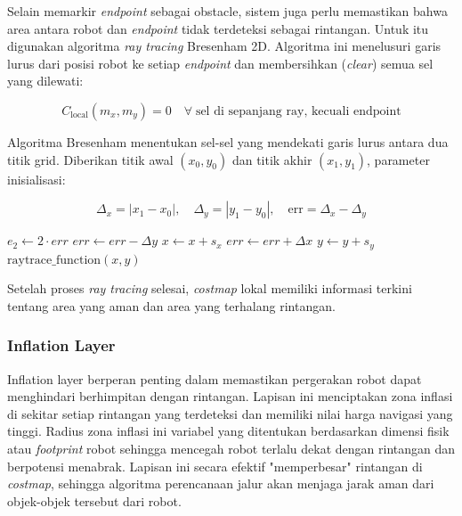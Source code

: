 Selain memarkir \emph{endpoint} sebagai obstacle, sistem juga perlu
memastikan bahwa area antara robot dan \emph{endpoint} tidak terdeteksi
sebagai rintangan. Untuk itu digunakan algoritma \emph{ray tracing}
Bresenham 2D. Algoritma ini menelusuri garis lurus dari posisi robot
ke setiap \emph{endpoint} dan membersihkan (\emph{clear}) semua sel
yang dilewati:

\begin{equation}
C_{\text{local}}(m_x, m_y) = 0
\quad \forall\; \text{sel di sepanjang ray, kecuali endpoint}
\end{equation}

Algoritma Bresenham menentukan sel-sel yang mendekati garis lurus
antara dua titik grid. Diberikan titik awal $(x_0, y_0)$ dan titik
akhir $(x_1, y_1)$, parameter inisialisasi:

\begin{equation}
\Delta_x = |x_1 - x_0|,\quad
\Delta_y = |y_1 - y_0|,\quad
\text{err} = \Delta_x - \Delta_y
\end{equation}

\begin{algorithm}[H]
\caption{Bresenham Raytracing}
\begin{algorithmic}[1]
    \State $e_2 \gets 2 \cdot \mathit{err}$
        \State $\mathit{err} \gets \mathit{err} - \Delta y$
        \State $x \gets x + s_x$
    \EndIf
        \State $\mathit{err} \gets \mathit{err} + \Delta x$
        \State $y \gets y + s_y$
    \EndIf
    \State $\text{raytrace\_function}(x, y)$
\EndWhile
\end{algorithmic}
\end{algorithm}

Setelah proses \emph{ray tracing} selesai, \emph{costmap} lokal
memiliki informasi terkini tentang area yang aman dan area yang
terhalang rintangan.

\subsubsection{Inflation Layer}
Inflation layer berperan penting dalam memastikan pergerakan robot dapat menghindari berhimpitan dengan rintangan. Lapisan ini menciptakan zona inflasi di sekitar setiap rintangan yang terdeteksi dan memiliki nilai harga navigasi yang tinggi. Radius zona inflasi ini variabel yang ditentukan berdasarkan dimensi fisik atau \emph{footprint} robot sehingga mencegah robot terlalu dekat dengan rintangan dan berpotensi menabrak. Lapisan ini secara efektif "memperbesar" rintangan di \emph{costmap}, sehingga algoritma perencanaan jalur akan menjaga jarak aman dari objek-objek tersebut dari robot. 

